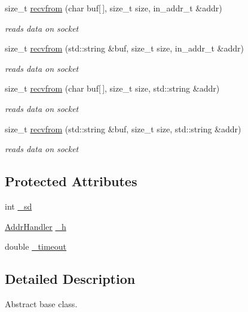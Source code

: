 \begin{CompactItemize}
\begin{CompactItemize}
size\_\-t \hyperlink{classsocketpp_1_1BaseSocket_ed28eb7e4a5abee65143bcdf162673f4}{recvfrom} (char buf\mbox{[}$\,$\mbox{]}, size\_\-t size, in\_\-addr\_\-t \&addr)
\begin{CompactList}\small\item\em reads data on socket \item\end{CompactList}\item 
size\_\-t \hyperlink{classsocketpp_1_1BaseSocket_8224b8434da862a72b774a3c80006fcb}{recvfrom} (std::string \&buf, size\_\-t size, in\_\-addr\_\-t \&addr)
\begin{CompactList}\small\item\em reads data on socket \item\end{CompactList}\item 
size\_\-t \hyperlink{classsocketpp_1_1BaseSocket_c7a79cd90b082806dcafb14fbbd130b8}{recvfrom} (char buf\mbox{[}$\,$\mbox{]}, size\_\-t size, std::string \&addr)
\begin{CompactList}\small\item\em reads data on socket \item\end{CompactList}\item 
size\_\-t \hyperlink{classsocketpp_1_1BaseSocket_ace82407e13a6eee26aa1f5f642d0cfc}{recvfrom} (std::string \&buf, size\_\-t size, std::string \&addr)
\begin{CompactList}\small\item\em reads data on socket \item\end{CompactList}\end{CompactItemize}
\subsection*{Protected Attributes}
\begin{CompactItemize}
\item 
int \hyperlink{classsocketpp_1_1BaseSocket_a5ef6b5fabb3988bced6a23d9631985d}{\_\-sd}
\item 
\hyperlink{classsocketpp_1_1AddrHandler}{AddrHandler} \hyperlink{classsocketpp_1_1BaseSocket_1e44e3c6c2ecd89c2aa716cc62528620}{\_\-h}
\item 
double \hyperlink{classsocketpp_1_1BaseSocket_418af5a1fe752cef38e4c6679780224c}{\_\-timeout}
\end{CompactItemize}


\subsection{Detailed Description}
Abstract base class. 


\end{CompactItemize}
